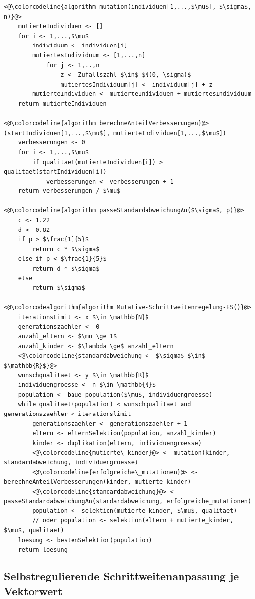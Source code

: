 \begin{lstlisting}[caption={Mutative Schrittweitenregelung}, firstnumber=1, captionpos=b, label=lst:mutative_schrittweitenrgelung_es]
<@\colorcodeline{algorithm mutation(individuen[1,...,$\mu$], $\sigma$, n)}@>
	mutierteIndividuen <- []
	for i <- 1,...,$\mu$
		individuum <- individuen[i]
		mutiertesIndividuum <- [1,...,n]		
			for j <- 1,..,n
				z <- Zufallszahl $\in$ $N(0, \sigma)$
				mutiertesIndividuum[j] <- individuum[j] + z
		mutierteIndividuen <- mutierteIndividuen + mutiertesIndividuum
	return mutierteIndividuen
	
<@\colorcodeline{algorithm berechneAnteilVerbesserungen}@>(startIndividuen[1,...,$\mu$], mutierteIndividuen[1,...,$\mu$])
	verbesserungen <- 0	
	for i <- 1,...,$\mu$
		if qualitaet(mutierteIndividuen[i]) > qualitaet(startIndividuen[i])
			verbesserungen <- verbesserungen + 1
	return verbesserungen / $\mu$
	
<@\colorcodeline{algorithm passeStandardabweichungAn($\sigma$, p)}@>
	c <- 1.22
	d <- 0.82
	if p > $\frac{1}{5}$
		return c * $\sigma$
	else if p < $\frac{1}{5}$
		return d * $\sigma$
	else
		return $\sigma$

<@\colorcodealgorithm{algorithm Mutative-Schrittweitenregelung-ES()}@>
	iterationsLimit <- x $\in \mathbb{N}$
	generationszaehler <- 0
	anzahl_eltern <- $\mu \ge 1$
	anzahl_kinder <- $\lambda \ge$ anzahl_eltern
	<@\colorcodeline{standardabweichung <- $\sigma$ $\in$ $\mathbb{R}$}@>
	wunschqualitaet <- y $\in \mathbb{R}$
	individuengroesse <- n $\in \mathbb{N}$
	population <- baue_population($\mu$, individuengroesse)
	while qualitaet(population) < wunschqualitaet and generationszaehler < iterationslimit
		generationszaehler <- generationszaehler + 1
		eltern <- elternSelektion(population, anzahl_kinder)
		kinder <- duplikation(eltern, individuengroesse)
		<@\colorcodeline{mutierte\_kinder}@> <- mutation(kinder, standardabweichung, individuengroesse)
		<@\colorcodeline{erfolgreiche\_mutationen}@> <- berechneAnteilVerbesserungen(kinder, mutierte_kinder)
		<@\colorcodeline{standardabweichung}@> <- passeStandardabweichungAn(standardabweichung, erfolgreiche_mutationen)
		population <- selektion(mutierte_kinder, $\mu$, qualitaet)
		// oder population <- selektion(eltern + mutierte_kinder, $\mu$, qualitaet)
	loesung <- bestenSelektion(population)
	return loesung
\end{lstlisting}

\subsection{Selbstregulierende Schrittweitenanpassung je Vektorwert}

